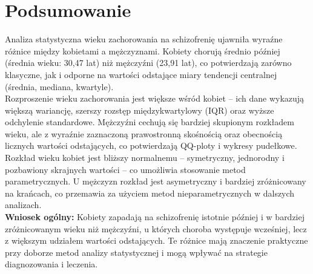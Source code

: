 \documentclass{mwart}
\begin{document}
	\section{Podsumowanie}
	\noindent
	Analiza statystyczna wieku zachorowania na schizofrenię ujawniła wyraźne różnice między kobietami a mężczyznami. Kobiety chorują średnio później (średnia wieku: 30{,}47 lat) niż mężczyźni (23{,}91 lat), co potwierdzają zarówno klasyczne, jak i odporne na wartości odstające miary tendencji centralnej (średnia, mediana, kwartyle).\\
	\noindent 
	Rozproszenie wieku zachorowania jest większe wśród kobiet – ich dane wykazują większą wariancję, szerszy rozstęp międzykwartylowy (IQR) oraz wyższe odchylenie standardowe. Mężczyźni cechują się bardziej skupionym rozkładem wieku, ale z wyraźnie zaznaczoną prawostronną skośnością oraz obecnością licznych wartości odstających, co potwierdzają QQ-ploty i wykresy pudełkowe.\\
	\noindent
	Rozkład wieku kobiet jest bliższy normalnemu – symetryczny, jednorodny i pozbawiony skrajnych wartości – co umożliwia stosowanie metod parametrycznych. U mężczyzn rozkład jest asymetryczny i bardziej zróżnicowany na krańcach, co przemawia za użyciem metod nieparametrycznych w dalszych analizach.\\
	\noindent
	\textbf{Wniosek ogólny:} Kobiety zapadają na schizofrenię istotnie później i w bardziej zróżnicowanym wieku niż mężczyźni, u których choroba występuje wcześniej, lecz z większym udziałem wartości odstających. Te różnice mają znaczenie praktyczne przy doborze metod analizy statystycznej i mogą wpływać na strategie diagnozowania i leczenia.
	
	
	
	
\end{document}
